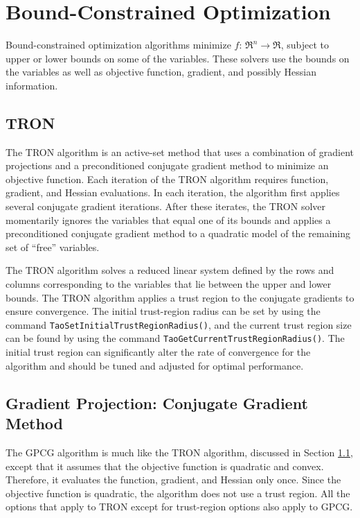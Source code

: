 \section{Bound-Constrained Optimization}
\label{chapter:bound}

Bound-constrained optimization algorithms
minimize $f: \, \Re^n \to \Re$, subject to upper or
lower bounds on some of the variables.
These solvers use the bounds on the variables as well as objective
function, gradient, and possibly Hessian information.

\subsection{TRON}\label{sec:tron}  
The TRON \cite{lin_c3} algorithm is an active-set method that uses a 
combination of gradient projections and 
a preconditioned conjugate gradient method to minimize an objective function.
Each iteration of the TRON algorithm requires function, gradient, 
and Hessian evaluations.  In each iteration, the algorithm
first applies several conjugate gradient iterations.  
After these iterates, the TRON solver momentarily ignores the variables
that equal one of its bounds and
applies a preconditioned conjugate gradient method to a
quadratic model of the remaining set of ``free'' variables.  


The TRON algorithm solves a reduced linear system
defined by the rows and columns corresponding to the variables that
lie between the upper and lower bounds.
The TRON algorithm applies a trust region to the 
conjugate gradients to ensure convergence.  The initial trust-region
radius
can be set by using the command 
{\tt Tao\-Set\-Initial\-Trust\-Region\-Radius()},
and the current trust region size can be found by using the command
{\tt Tao\-Get\-Current\-Trust\-Region\-Radius()}.
The initial trust region can significantly alter the 
rate of convergence for the algorithm and should be
tuned and adjusted for optimal performance.


\subsection{Gradient Projection: Conjugate Gradient Method}
The GPCG \cite{more-toraldo} algorithm is much like the TRON algorithm, discussed in
Section \ref{sec:tron}, except that
it assumes that the objective function is quadratic and convex.
Therefore, it evaluates the function, gradient, and Hessian only
once.
Since the objective function
is quadratic, the algorithm does not use a trust region.  
All the options that apply to TRON except for trust-region
options also apply to GPCG.

